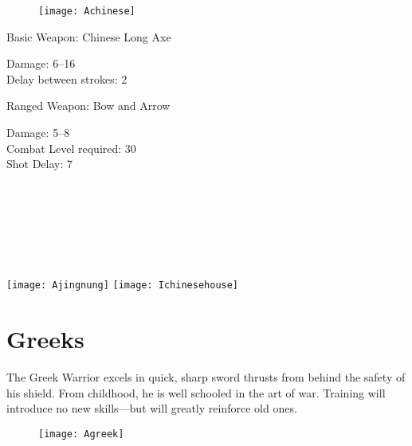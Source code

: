 \begin{wrapfigure}{r}{0.5\textwidth}
	\begin{center}
		\vspace{-20pt}
		\texttt{[image: Achinese]}
	\end{center}
	\vspace{-20pt}
\end{wrapfigure}

Basic Weapon: Chinese Long Axe
\begin{adjustwidth}{1cm}{}
	Damage: 6–16 \\
	Delay between strokes: 2
\end{adjustwidth}
Ranged Weapon: Bow and Arrow
\begin{adjustwidth}{1cm}{}
	Damage: 5–8 \\
	Combat Level required: 30 \\
	Shot Delay: 7 \\ \\ \\ \\ \\ \\ \\
\end{adjustwidth}

\begin{center}
\texttt{[image: Ajingnung]} \hspace{1pt} \texttt{[image: Ichinesehouse]}
\end{center}

\clearpage

\section{Greeks}


The Greek Warrior excels in quick, sharp sword thrusts from behind the safety of his shield. From childhood, he is well schooled in the art of war. Training will introduce no new skills---but will greatly reinforce old ones.

\begin{wrapfigure}{r}{0.5\textwidth}
	\begin{center}
		\vspace{-20pt}
		\texttt{[image: Agreek]}
	\end{center}
	\vspace{-20pt}
\end{wrapfigure}

